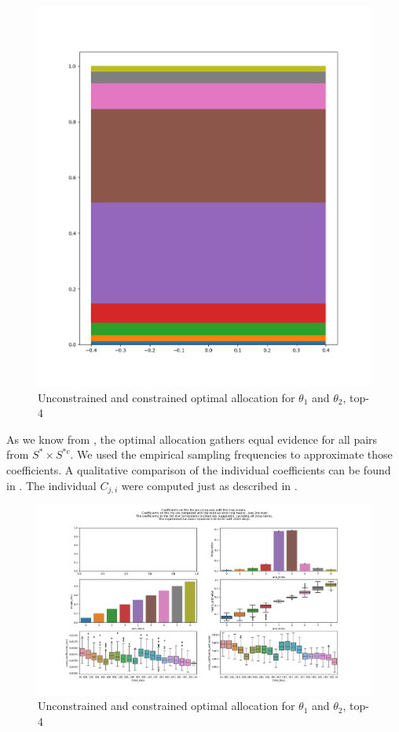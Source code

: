 \begin{figure}[h]
  \centering
  \includegraphics[width=\textwidth]{190723-selections_2.png}
  \caption{Unconstrained and constrained optimal allocation for $\theta_1$ and $\theta_2$, top-4}
  \label{fig:measurement_plan}
\end{figure}

As we know from , the optimal allocation gathers equal evidence for all pairs from $S^* \times S^{*c}$. We used the empirical sampling frequencies to approximate those coefficients. A qualitative comparison of the individual coefficients can be found in . The individual $C_{j, i}$ were computed just as described in .

\begin{figure}[h]
  \centering
  \includegraphics[width=\textwidth]{190909-coefficients_2000.png}
  \caption{Unconstrained and constrained optimal allocation for $\theta_1$ and $\theta_2$, top-4}
  \label{fig:algorithm_coefficients}
\end{figure}

